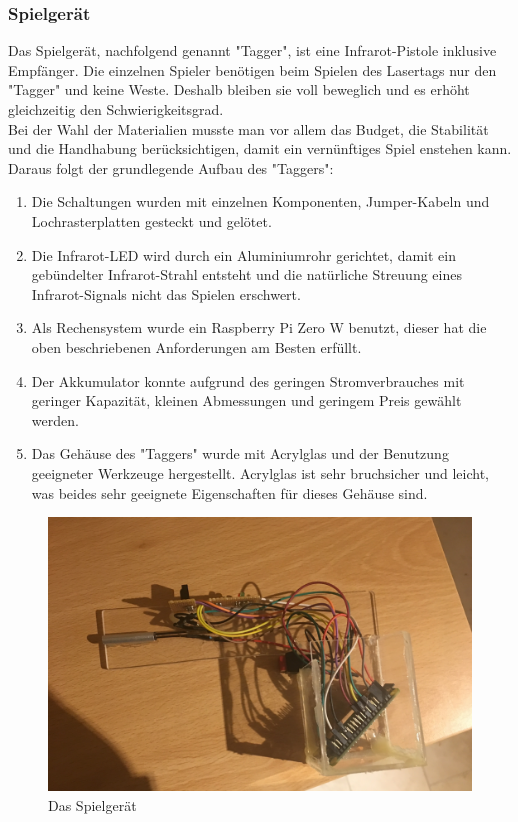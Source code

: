 \subsubsection{Spielgerät}

Das Spielgerät, nachfolgend genannt "Tagger", ist eine Infrarot-Pistole inklusive Empfänger. Die einzelnen Spieler benötigen beim Spielen des Lasertags nur den "Tagger" und keine Weste. Deshalb bleiben sie voll beweglich und es erhöht gleichzeitig den Schwierigkeitsgrad. \\
Bei der Wahl der Materialien musste man vor allem das Budget, die Stabilität und die Handhabung berücksichtigen, damit ein vernünftiges Spiel enstehen kann. Daraus folgt der grundlegende Aufbau des "Taggers":
\begin{enumerate}
	\item Die Schaltungen wurden mit einzelnen Komponenten, Jumper-Kabeln und Lochrasterplatten gesteckt und gelötet.
	\item Die Infrarot-LED wird durch ein Aluminiumrohr gerichtet, damit ein gebündelter Infrarot-Strahl entsteht und die natürliche Streuung eines Infrarot-Signals nicht das Spielen erschwert.
	\item Als Rechensystem wurde ein Raspberry Pi Zero W benutzt, dieser  hat die oben beschriebenen Anforderungen am Besten erfüllt.
	\item Der Akkumulator konnte aufgrund des geringen Stromverbrauches mit geringer Kapazität, kleinen Abmessungen und geringem Preis gewählt werden.
	\item Das Gehäuse des "Taggers" wurde mit Acrylglas und der Benutzung geeigneter Werkzeuge hergestellt. Acrylglas ist sehr bruchsicher und leicht, was beides sehr geeignete Eigenschaften für dieses Gehäuse sind.
\end{enumerate}
\begin{figure}[ht]
	\centering
		\includegraphics[width=0.7 \textwidth]{./040-komponenten/010-hardware/tagger.jpg}
	\caption{Das Spielgerät}
	\label{fig:Bild1Hardware}
\end{figure}

